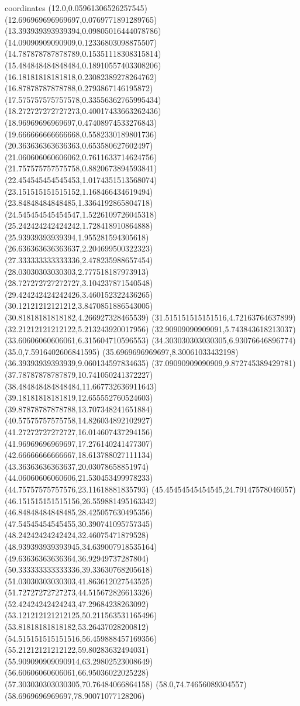 coordinates {%
(12.0,0.05961306526257545)
(12.696969696969697,0.0769771891289765)
(13.393939393939394,0.09805016444078786)
(14.09090909090909,0.12336803098875507)
(14.787878787878789,0.15351118308315814)
(15.484848484848484,0.18910557403308206)
(16.18181818181818,0.23082389278264762)
(16.87878787878788,0.2793867146195872)
(17.575757575757578,0.33556362765995434)
(18.272727272727273,0.40017433663262436)
(18.96969696969697,0.47408974533276843)
(19.666666666666668,0.5582330189801736)
(20.363636363636363,0.653580627602497)
(21.060606060606062,0.7611633714624756)
(21.757575757575758,0.8820673894593841)
(22.454545454545453,1.0174351513568074)
(23.151515151515152,1.168466434619494)
(23.84848484848485,1.3364192865804718)
(24.545454545454547,1.5226109726045318)
(25.242424242424242,1.728418910864888)
(25.93939393939394,1.955281594305618)
(26.636363636363637,2.204699500322323)
(27.333333333333336,2.478235988657454)
(28.03030303030303,2.777518187973913)
(28.727272727272727,3.104237871540548)
(29.424242424242426,3.460152322436265)
(30.12121212121212,3.8470851886543005)
(30.81818181818182,4.266927328465539)
(31.515151515151516,4.72163764637899)
(32.21212121212122,5.213243920017956)
(32.90909090909091,5.743843618213037)
(33.60606060606061,6.315604710596553)
(34.303030303030305,6.93076646896774)
(35.0,7.5916402606841595)
(35.6969696969697,8.30061033432198)
(36.39393939393939,9.060134597834635)
(37.09090909090909,9.872745389429781)
(37.78787878787879,10.741050241372227)
(38.484848484848484,11.667732636911643)
(39.18181818181819,12.655552760524603)
(39.87878787878788,13.707348241651884)
(40.57575757575758,14.826034892102927)
(41.27272727272727,16.014607437294156)
(41.96969696969697,17.276140241477307)
(42.66666666666667,18.613788027111134)
(43.36363636363637,20.03078658851974)
(44.06060606060606,21.530453499978233)
(44.75757575757576,23.11618881835793)
(45.45454545454545,24.79147578046057)
(46.151515151515156,26.559881495163342)
(46.84848484848485,28.425057630495356)
(47.54545454545455,30.390741095757345)
(48.24242424242424,32.46075471879528)
(48.939393939393945,34.639007918535164)
(49.63636363636364,36.92949737287804)
(50.333333333333336,39.33630768205618)
(51.03030303030303,41.863612027543525)
(51.72727272727273,44.515672826613326)
(52.42424242424243,47.29684238263092)
(53.121212121212125,50.211563531165496)
(53.81818181818182,53.26437028200812)
(54.515151515151516,56.459888457169356)
(55.21212121212122,59.80283632494031)
(55.909090909090914,63.29802523008649)
(56.60606060606061,66.95036022025228)
(57.303030303030305,70.76484066864158)
(58.0,74.74656089304557)
(58.6969696969697,78.90071077128206)
}
